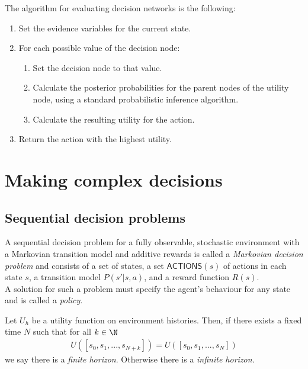 \documentclass{article}
\begin{document}
\begin{theorem}
    The algorithm for evaluating decision networks is the following:
    \begin{enumerate}
        \item Set the evidence variables for the current state.
        \item For each possible value of the decision node: \begin{enumerate}
            \item Set the decision node to that value.
            \item Calculate the posterior probabilities for the parent nodes of
            the utility node, using a standard probabilistic inference algorithm.
            \item Calculate the resulting utility for the action.
        \end{enumerate}
        \item Return the action with the highest utility.
    \end{enumerate}
\end{theorem}


\section{Making complex decisions}


\subsection{Sequential decision problems}

\begin{definition}
    A sequential decision problem for a fully observable, stochastic environment
    with a Markovian transition model and additive rewards is called a \emph{Markovian
    decision problem} and consists of a set of states, a set $\textsf{ACTIONS}(s)$ of
    actions in each state $s$, a transition model $P(s'|s,a)$, and a reward function
    $R(s)$.\\
    A solution for such a problem must specify the agent's behaviour for any state
    and is called a \emph{policy}.
\end{definition}

\begin{definition}
    Let $U_h$ be a utility function on environment histories. Then, if there exists
    a fixed time $N$ such that for all $k\in\N$
    \begin{align*}
        U([s_0,s_1,...,s_{N+k}]) = U([s_0,s_1,...,s_N]) 
    \end{align*}
    we say there is a \emph{finite horizon}. Otherwise there is a \emph{infinite
    horizon}.
\end{definition}
\end{document}
